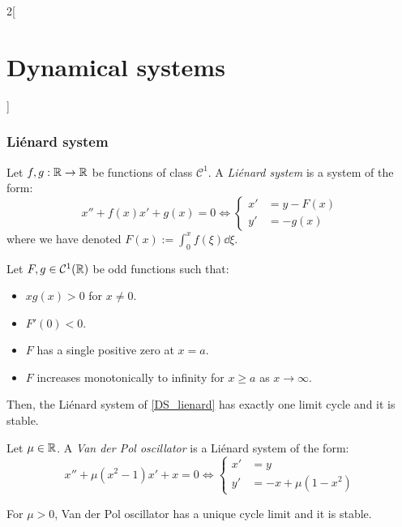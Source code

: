 \documentclass[../../../main_math.tex]{subfiles}
\begin{document}
\begin{multicols}{2}[\section{Dynamical systems}]
  \subsubsection{Liénard system}
  \begin{definition}
    Let $f,g:\mathbb{R}\rightarrow\mathbb{R}$ be functions of class $\mathcal{C}^1$. A \emph{Liénard system} is a system of the form:
    \begin{equation}\label{DS_lienard}
      x''+f(x)x'+g(x)=0\iff\left\{
      \begin{aligned}
        x' & =y-F(x) \\
        y' & =-g(x)
      \end{aligned}
      \right.
    \end{equation}
    where we have denoted $F(x):=\int_0^xf(\xi)\dd{\xi}$.
  \end{definition}
  \begin{theorem}
    Let $F,g\in \mathcal{C}^1(\mathbb{R})$ be odd functions such that:
    \begin{itemize}
      \item $xg(x)>0$ for $x\ne 0$.
      \item $F'(0)<0$.
      \item $F$ has a single positive zero at $x=a$.
      \item $F$ increases monotonically to infinity for $x\geq a$ as $x\to\infty$.
    \end{itemize}
    Then, the Liénard system of \cref{DS_lienard} has exactly one limit cycle and it is stable.
  \end{theorem}
  \begin{definition}
    Let $\mu\in\mathbb{R}$. A \emph{Van der Pol oscillator} is a Liénard system of the form:
    \begin{equation}\label{DS_vanderpol}
      x''+\mu(x^2-1)x'+x=0\iff\left\{
      \begin{aligned}
        x' & =y              \\
        y' & =-x +\mu(1-x^2)
      \end{aligned}
      \right.
    \end{equation}
  \end{definition}
  \begin{corollary}
    For $\mu>0$, Van der Pol oscillator has a unique cycle limit and it is stable.
  \end{corollary}

\end{multicols}
\end{document}
